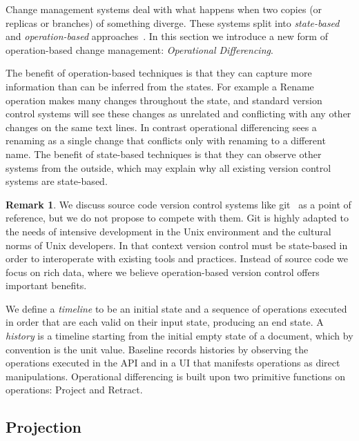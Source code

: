 \documentclass[english,submission]{programming}
\theoremstyle{definition}
\newtheorem*{remark}{Remark}
\begin{document}
Change management systems deal with what happens when two copies (or replicas or branches) of something diverge.
These systems split into \textit{state-based} and \textit{operation-based} approaches~\cite{diff3, Shapiro11}.
In this section we introduce a new form of operation-based change management: \textit{Operational Differencing}.

The benefit of operation-based techniques is that they can capture more information than can be inferred from the states.
For example a \textsf{Rename} operation makes many changes throughout the state, and standard version control systems will see these changes as unrelated and conflicting with any other changes on the same text lines. In contrast operational differencing sees a renaming as a single change that conflicts only with renaming to a different name.
The benefit of state-based techniques is that they can observe other systems from the outside, which may explain why all existing version control systems are state-based.

\begin{remark}
We discuss source code version control systems like git~\cite{ProGit} as a point of reference, but we do not propose to compete with them. Git is highly adapted to the needs of intensive development in the Unix environment and the cultural norms of Unix developers. In that context version control must be state-based in order to interoperate with existing tools and practices. Instead of source code we focus on rich data, where we believe operation-based version control offers important benefits.
\end{remark}

We define a \textit{timeline} to be an initial state and a sequence of operations executed in order that are each valid on their input state, producing an end state.
A \textit{history} is a timeline starting from the initial empty state of a document, which by convention is the unit value.
Baseline records histories by observing the operations executed in the API and in a UI that manifests operations as direct manipulations. Operational differencing is built upon two primitive functions on operations: \textsf{Project} and \textsf{Retract}.

\subsection{Projection}
\end{document}
